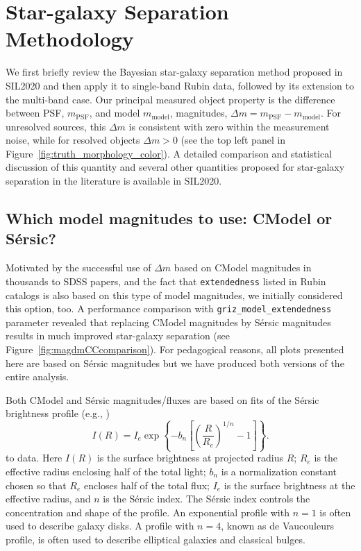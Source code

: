 
\section{Star-galaxy Separation Methodology}

We first briefly review the Bayesian star-galaxy separation method proposed in SIL2020 and then
apply it to single-band Rubin data, followed by its extension to the multi-band case. Our principal
measured object property is the difference between PSF, \(m_{\mathrm{PSF}}\), and model  \(m_{\mathrm{model}}\),
magnitudes, \(\Delta m = m_{\mathrm{PSF}} - m_{\mathrm{model}}\). For unresolved sources, this \(\Delta m\) is consistent with zero within the measurement noise, while for resolved objects \(\Delta m > 0\) (see the top left panel in Figure~\ref{fig:truth_morphology_color}).
A detailed comparison and statistical discussion of this quantity and several other quantities proposed for
star-galaxy separation in the literature is available in SIL2020. 



\subsection{Which model magnitudes to use: CModel or  S\'{e}rsic?} 

Motivated by the successful use of \(\Delta m \) based on CModel magnitudes in thousands to SDSS papers,
and the fact that \texttt{extendedness} listed in Rubin catalogs is also based on this type of model
magnitudes, we initially considered this option, too. A performance comparison with 
\texttt{griz\_model\_extendedness} parameter revealed that replacing CModel magnitudes by S\'{e}rsic
magnitudes results in much improved star-galaxy separation (see Figure~\ref{fig:magdmCCcomparison}). 
For pedagogical reasons, all plots presented here are based on S\'{e}rsic magnitudes but we have
produced both versions of the entire analysis.

Both CModel and S\'{e}rsic magnitudes/fluxes are based on fits of the S\'{e}rsic brightness profile
(e.g., \citealt{2005PASA...22..118G})
\begin{equation}
          I(R)=I_e\exp\left\{ -b_n\left[ \left(\frac{R}{R_e}\right)^{1/n}-1 \right]\right\}.
\end{equation}
to data.  Here $I(R)$ is the surface brightness at projected radius $R$; $R_e$ is the effective
radius enclosing half of the total light; $b_n$ is a normalization constant chosen so that $R_e$
encloses half of the total flux; $I_e$ is the surface brightness at the effective radius, and 
$n$ is the S\'ersic index. The S\'{e}rsic index controls the concentration and shape of the profile.
An exponential profile with $n=1$ is often used to describe galaxy disks. A profile with $n=4$, known
as de Vaucouleurs profile, is often used to describe elliptical galaxies and classical bulges.

